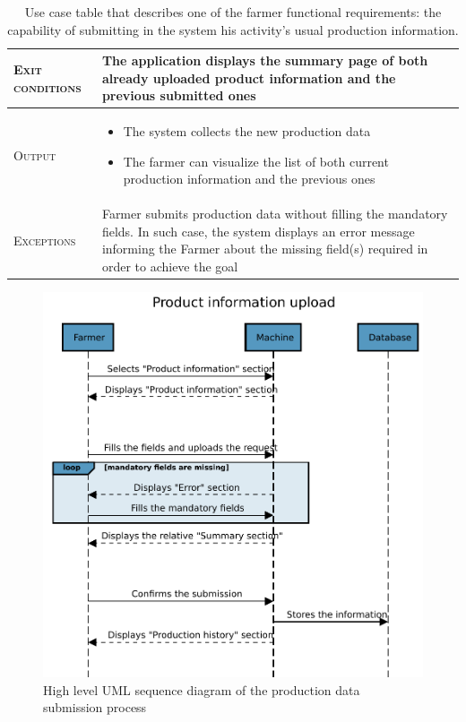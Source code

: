 \begin{table}[H]
\begin{tabular}[c]{|l|p{}|}
        \hline %
        \textsc{Exit conditions}    &  The application displays the summary page of both already uploaded product information and the previous submitted ones\\
    	\hline %
    	\textsc{Output}             &  \begin{itemize}
    	    \item The system collects the new production data
    	    \item The farmer can visualize the list of both current production information and the previous ones
    	\end{itemize}\\
    	\hline %
    	\textsc{Exceptions}         &  Farmer submits production data without filling the mandatory fields. In such case, the system displays an error message informing the Farmer about the missing field(s) required in order to achieve the goal\\
    	\hline %
        
    \end{tabular}
    \caption{\label{tab:Production_data_submission}Use case table that describes one of the farmer functional requirements: the capability of submitting in the system his activity's usual production information.}
\end{table}


\begin{figure}[H]
	\centering
    \includegraphics[page=1, width=\textwidth]{Images/SeqDiag/product_info_upload_seq_diag.pdf}
	\caption{\label{fig:product_info_seq_diag}High level UML sequence diagram of the production data submission process}
\end{figure}


